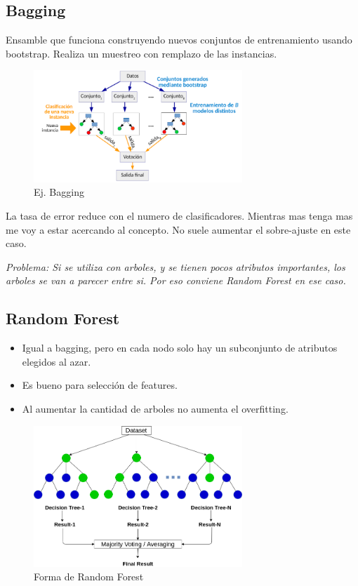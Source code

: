 \documentclass[titlepage,a4paper]{article}
\begin{document}
\subsection{Bagging}

Ensamble que funciona construyendo nuevos conjuntos de entrenamiento usando bootstrap. Realiza un muestreo con remplazo de las instancias.

\begin{figure}[!htb]
    \centering
    \includegraphics[width=0.7\textwidth]{imagenesResumen/Bagging.PNG}
    \caption{Ej. Bagging}
\end{figure}

La tasa de error reduce con el numero de clasificadores. Mientras mas tenga mas me voy a estar acercando al concepto. No suele aumentar el sobre-ajuste en este caso.

\textit{Problema: Si se utiliza con arboles, y se tienen pocos atributos importantes, los arboles se van a parecer entre si. Por eso conviene Random Forest en ese caso.}

\subsection{Random Forest}

\begin{itemize}
    \item Igual a bagging, pero en cada nodo solo hay un subconjunto de atributos elegidos al azar.
    \item Es bueno para selección de features.
    \item Al aumentar la cantidad de arboles no aumenta el overfitting.
\end{itemize}

\begin{figure}[!htb]
    \centering
    \includegraphics[width=0.7\textwidth]{imagenesResumen/RandomForest.png}
    \caption{Forma de Random Forest}
\end{figure}
\end{document}
